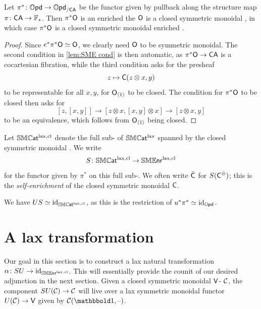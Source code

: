 \documentclass[a4paper,11pt]{article}
\begin{document}
\begin{propn}
  Let $\pi^{*} \colon \OPD \to \OPDsl{\CA}$ be the functor given by
  pullback along the structure map $\pi \colon \CA \to \xF_{*}$. Then
  $\pi^{*}\textup{\textsf{O}}$ is an enriched \iopd{} \IFF{} the \iopd{} $\textup{\textsf{O}}$ is a
  closed symmetric monoidal \icat{}, in which case $\pi^{*}\textup{\textsf{O}}$ is a
  closed symmetric monoidal enriched \icat{}.
\end{propn}
\begin{proof}
  Since $e^{*}\pi^{*}\textup{\textsf{O}} \simeq \textup{\textsf{O}}$, we clearly need $\textup{\textsf{O}}$ to be
  symmetric monoidal. The second condition in \cref{lem:SME cond} is
  then automatic, as $\pi^{*}\oO \to \CA$ is a cocartesian fibration,
  while the third condition asks for the presheaf
  \[ z \mapsto \textup{\textsf{C}}(z \otimes x, y)\] to be representable for all
  $x,y$, \ie{} for $\textup{\textsf{O}}_{\langle 1 \rangle}$ to be closed. The condition for
  $\pi^{*}\textup{\textsf{O}}$ to be closed then asks for
  \[ [z, [x,y]] \to [z \otimes x, [x,y] \otimes x] \to [z \otimes x,
    y]\] to be an equivalence, which follows from $\textup{\textsf{O}}_{\langle 1 \rangle}$
  being closed.
\end{proof}

\begin{notation}
  Let $\mathbb{SMC}\mkern-0.5mu\textsf{\textup{at}}^{\text{\textup{lax}},\text{\textup{cl}}}$ denote the full sub-\itcat{} of $\mathbb{SMC}\mkern-0.5mu\textsf{\textup{at}}^{\text{\textup{lax}}}$ spanned by
  the closed symmetric monoidal \icats{}. We write
  \[ S \colon \SMCATlcl \to \SMENRlcl \]
  for the functor given by $\pi^{*}$ on this full sub-\itcat{}. We
  often write $\bar{\textup{\textsf{C}}}$ for $S(\textup{\textsf{C}}^{\otimes})$; this is the
  \emph{self-enrichment} of the closed symmetric monoidal \icat{}
  $\textup{\textsf{C}}$.
\end{notation}

\begin{observation}
  We have $US \simeq \text{\textup{id}}_{\mathbb{SMC}\mkern-0.5mu\textsf{\textup{at}}^{\text{\textup{lax}},\text{\textup{cl}}}}$, as this is the restriction of
  $u^{*}\pi^{*} \simeq \text{\textup{id}}_{\mathbb{O}\mkern-0.5mu\textsf{\textup{pd}}}$.
\end{observation}

\section{A lax transformation}\label{sec:lax tr}

Our goal in this section is to construct a lax natural transformation
$\alpha \colon SU \to \id_{\SMENRlcl}$. This will essentially
provide the counit of our desired adjunction in the next
section. Given a closed symmetric monoidal $\textup{\textsf{V}}$-\icat{} $\mathcal{C}$, the
component $SU(\eC) \to \eC$ will live over a lax symmetric monoidal
functor $U(\nC) \to \oV$ given by $\eC(\bbone,\blank)$. 
\end{document}
